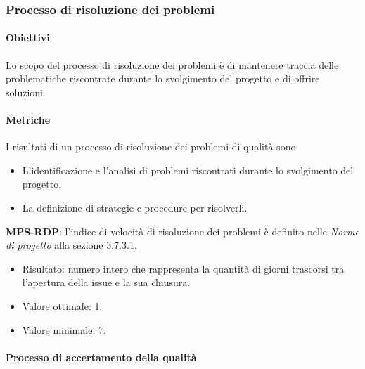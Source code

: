 \documentclass[../piano-di-qualifica.tex]{subfiles}
\begin{document}
\subsubsection{Processo di risoluzione dei problemi}%
\label{subs:processo_di_risoluzione_dei_problemi}

\paragraph{Obiettivi}%
\label{par:obiettivi_prob}

Lo scopo del processo di risoluzione dei problemi è di mantenere traccia delle problematiche riscontrate durante lo svolgimento del progetto e di offrire soluzioni.


\paragraph{Metriche}%
\label{par:metriche_prob}

I risultati di un processo di risoluzione dei problemi di qualità sono:
\begin{itemize}

  \item L'identificazione e l'analisi di problemi riscontrati durante lo svolgimento del progetto.
  \item La definizione di strategie e procedure per risolverli.
\end{itemize}

\textbf{MPS-RDP}: l'indice di velocità di risoluzione dei problemi è definito nelle \textit{Norme di progetto} alla sezione 3.7.3.1.
\begin{itemize}
  \item Risultato: numero intero che rappresenta la quantità di giorni trascorsi tra l'apertura della issue e la sua chiusura.
  \item Valore ottimale: 1.
  \item Valore minimale: 7.
\end{itemize}

\paragraph{Processo di accertamento della qualità}%
\label{par:processo_di_accertamento_della_qualita}
\end{document}
